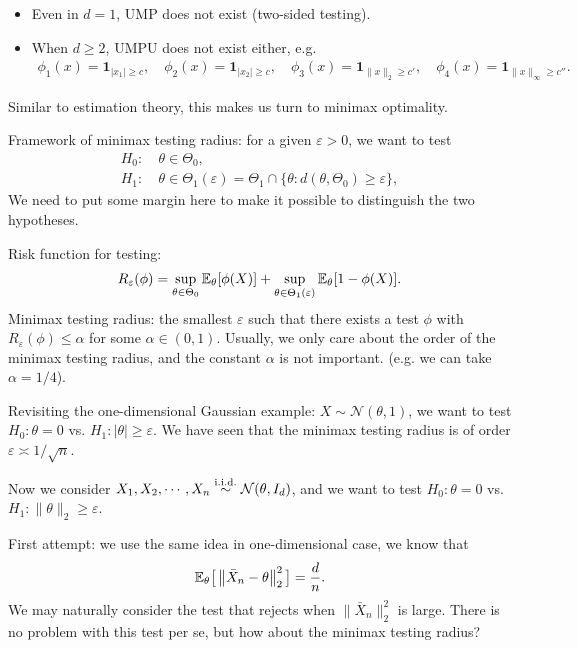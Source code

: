 \documentclass[11pt,letterpaper]{article}
\numberwithin{theorem}{lecture}
\numberwithin{proposition}{lecture}
\numberwithin{lemma}{lecture}
\numberwithin{claim}{lecture}
\numberwithin{corollary}{lecture}
\numberwithin{definition}{lecture}
\numberwithin{conjecture}{lecture}
\numberwithin{remark}{lecture}
\numberwithin{example}{lecture}
\numberwithin{equation}{lecture}
\begin{document}
\begin{itemize}
  \item Even in $d = 1$, UMP does not exist (two-sided testing).
  \item When $d \geq 2$, UMPU does not exist either, e.g.
  \begin{align*}
    \phi_1 (x) = \bm{1}_{|x_1| \geq c}, \quad \phi_2 (x) = \bm{1}_{|x_2| \geq c}, \quad \phi_3 (x) = \bm{1}_{\|x\|_2 \geq c'}, \quad \phi_4 (x) = \bm{1}_{\|x\|_\infty \geq c''}.
  \end{align*}
\end{itemize}
Similar to estimation theory, this makes us turn to minimax optimality.

Framework of minimax testing radius: for a given $\varepsilon > 0$, we want to test
\begin{align*}
  H_0:& ~\theta \in \Theta_0,\\
  H_1:& ~\theta \in \Theta_1 (\varepsilon) = \Theta_1 \cap \{ \theta: d(\theta, \Theta_0) \geq \varepsilon\},
\end{align*}
We need to put some margin here to make it possible to distinguish the two hypotheses.

Risk function for testing:
\begin{align*}
  R_\varepsilon (\phi) = \sup_{\theta \in \Theta_0} {\mathbb{E}}_\theta [\phi (X)] + \sup_{\theta \in \Theta_1 (\varepsilon)} {\mathbb{E}}_\theta [1 - \phi (X)].
\end{align*}
Minimax testing radius: the smallest $\varepsilon$ such that there exists a test $\phi$ with $R_\varepsilon (\phi) \leq \alpha$ for some $\alpha \in (0, 1)$. Usually, we only care about the order of the minimax testing radius, and the constant $\alpha$ is not important. (e.g. we can take $\alpha = 1/4$).

Revisiting the one-dimensional Gaussian example: $X \sim \mathcal{N} (\theta, 1)$, we want to test $H_0: \theta = 0$ vs. $H_1: |\theta| \geq \varepsilon$. We have seen that the minimax testing radius is of order $\varepsilon \asymp 1/\sqrt{n}$.

\bigskip

Now we consider $X_1, X_2, \cdots, X_n \overset{\mathrm{i.i.d.}}{\sim} \mathcal{N} (\theta, I_d)$, and we want to test $H_0: \theta = 0$ vs. $H_1: \|\theta\|_2 \geq \varepsilon$.

First attempt: we use the same idea in one-dimensional case, we know that
\begin{align*}
  {\mathbb{E}}_\theta \big[ \left\| \bar{X}_n - \theta\right\|_{2}^2 \big] = \frac{d}{n}.
\end{align*}
We may naturally consider the test that rejects when $\|\bar{X}_n\|_2^2$ is large. There is no problem with this test per se, but how about the minimax testing radius?
\end{document}
